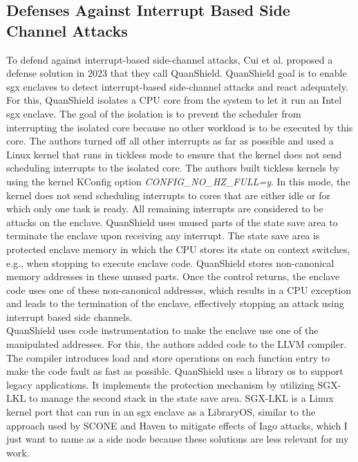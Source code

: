 \subsection{Defenses Against Interrupt Based Side Channel Attacks}
\label{sec:20:interrupt_sca}
To defend against interrupt-based side-channel attacks, Cui et al. proposed a
defense solution in 2023 that they call QuanShield.\cite{cui_quanshield_2023}
QuanShield goal is to enable \gls{sgx} enclaves to detect interrupt-based
side-channel attacks and react adequately. For this, QuanShield isolates a CPU
core from the system to let it run an Intel \gls{sgx} enclave. The goal of the
isolation is to prevent the scheduler from interrupting the isolated core
because no other workload is to be executed by this core. The authors turned off
all other interrupts as far as possible and used a Linux kernel that runs in
tickless mode to ensure that the kernel does not send scheduling interrupts to
the isolated core. The authors built tickless kernels by using the kernel
KConfig option \textit{CONFIG\_NO\_HZ\_FULL=y}. In this mode, the kernel does
not send scheduling interrupts to cores that are either idle or for which only
one task is ready.\cite{linuxtickless} All remaining interrupts are considered
to be attacks on the enclave. QuanShield uses unused parts of the state save
area to terminate the enclave upon receiving any interrupt. The state save area
is protected enclave memory in which the CPU stores its state on context
switches, e.g., when stopping to execute enclave code. QuanShield stores
non-canonical memory addresses in these unused parts. Once the control returns,
the enclave code uses one of these non-canonical addresses, which results in a
CPU exception and leads to the termination of the enclave, effectively stopping
an attack using interrupt based side channels.\\

QuanShield uses code instrumentation to make the enclave use one of the
manipulated addresses. For this, the authors added code to the LLVM compiler.
The compiler introduces load and store operations on each function entry to make
the code fault as fast as possible. QuanShield uses a library \gls{os} to
support legacy applications. It implements the protection mechanism by utilizing
SGX-LKL to manage the second stack in the state save area. SGX-LKL is a Linux
kernel port that can run in an \gls{sgx} enclave as a LibraryOS, similar to the
approach used by SCONE and Haven to mitigate effects of Iago attacks, which I
just want to name as a side node because these solutions are less relevant for
my work.\cite{priebe2019sgx,arnautov_scone_2016,baumann_shielding_2015,
checkoway2013iago}

